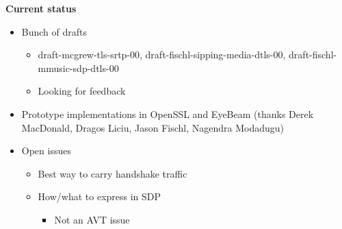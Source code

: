\documentclass[helvetica,fancybox,landscape]{seminar}
\newcommand{\heading}[1]{%
  \begin{center} 
    \large\bf 
    #1 
  \end{center} 
  \vspace{.4 in}}
\begin{document}
\begin{slide}
\heading{Current status}

\begin{itemize}
\item Bunch of drafts
\begin{itemize}
\item draft-mcgrew-tls-srtp-00, draft-fischl-sipping-media-dtls-00, draft-fischl-mmusic-sdp-dtls-00
\item Looking for feedback
\end{itemize}
\item Prototype implementations in OpenSSL and EyeBeam (thanks Derek MacDonald, Dragos Liciu, Jason Fischl, Nagendra Modadugu)
\item Open issues
\begin{itemize}
\item Best way to carry handshake traffic
\item How/what to express in SDP
\begin{itemize}
\item Not an AVT issue
\end{itemize}
\end{itemize}

\end{itemize}


\end{slide}
\end{document}
